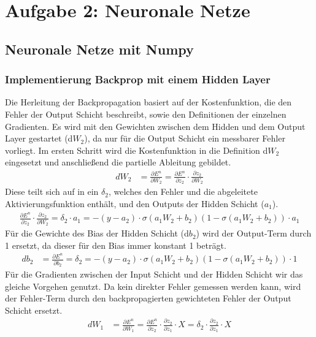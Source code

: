 \section{Aufgabe 2: Neuronale Netze}
\subsection{Neuronale Netze mit Numpy}
\subsubsection{Implementierung Backprop mit einem Hidden Layer}
Die Herleitung der Backpropagation basiert auf der Kostenfunktion, die den Fehler der Output Schicht beschreibt, sowie den Definitionen der einzelnen Gradienten. Es wird mit den Gewichten zwischen dem Hidden und dem Output Layer gestartet (d$W_{2}$), da nur für die Output Schicht ein messbarer Fehler vorliegt. Im ersten Schritt wird die Kostenfunktion in die  Definition d$W_{2}$ eingesetzt und anschließend die partielle Ableitung gebildet.
\begin{align*}
dW_{2} &= \frac{\partial E^{n}}{\partial W_{2}}
= \frac{\partial E^{n}}{\partial z_{2}}\cdot \frac{\partial z_{2}}{\partial W_{2}}
\end{align*}
Diese teilt sich auf in ein $\delta_{2}$, welches den Fehler und die abgeleitete Aktivierungsfunktion enthält, und den Outputs der Hidden Schicht ($a_{1}$).
\begin{align*}
\frac{\partial E^{n}}{\partial z_{2}}\cdot \frac{\partial z_{2}}{\partial W_{2}} = \delta_{2} \cdot a_{1}= -(y-a_{2}) \cdot \sigma(a_{1}W_{2}+b_{2})(1-\sigma(a_{1}W_{2}+b_{2}))\cdot a_{1}
\end{align*}
Für die Gewichte des Bias der Hidden Schicht (d$b_{2}$) wird der Output-Term durch 1 ersetzt, da dieser für den Bias immer konstant 1 beträgt.
\begin{align*}
db_{2} &= \frac{\partial E^{n}}{\partial b_{2}}
= \delta_{2} = -(y-a_{2}) \cdot \sigma(a_{1}W_{2}+b_{2})(1-\sigma(a_{1}W_{2}+b_{2})) \cdot 1
\end{align*}
Für die Gradienten zwischen der Input Schicht und der Hidden Schicht wir das gleiche Vorgehen genutzt. Da kein direkter Fehler gemessen werden kann, wird der Fehler-Term durch den backpropagierten gewichteten Fehler der Output Schicht ersetzt.
\begin{align*}
dW_{1} &= \frac{\partial E^{n}}{\partial W_{1}}
= \frac{\partial E^{n}}{\partial z_{2}}\cdot \frac{\partial z_{2}}{\partial z_{1}} \cdot X = \delta_{2} \cdot \frac{\partial z_{2}}{\partial z_{1}} \cdot X
\end{align*}
